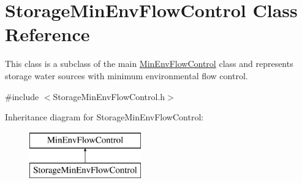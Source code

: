 \hypertarget{classStorageMinEnvFlowControl}{}\section{Storage\+Min\+Env\+Flow\+Control Class Reference}
\label{classStorageMinEnvFlowControl}


This class is a subclass of the main {\ttfamily \mbox{\hyperlink{classMinEnvFlowControl}{Min\+Env\+Flow\+Control}}} class and represents storage water sources with minimum environmental flow control.  




{\ttfamily \#include $<$Storage\+Min\+Env\+Flow\+Control.\+h$>$}

Inheritance diagram for Storage\+Min\+Env\+Flow\+Control\+:\begin{figure}[H]
\begin{center}
\leavevmode
\includegraphics[height=2.000000cm]{classStorageMinEnvFlowControl}
\end{center}
\end{figure}
